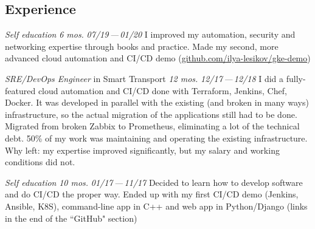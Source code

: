 \documentclass[11pt, a4paper]{article}
\newcommand{\Delimitline}{
  \vspace{-2ex}
  \noindent\makebox[\linewidth]{\rule{\DelimitlineLength}{0.12ex}} }
\newcommand{\forceindent}{\leavevmode{\parindent=1em\indent}}
\begin{document}
\subsection*{\vphantom{Professional Work }Experience}
\Delimitline

\begin{etaremune}[
  topsep=1ex,itemsep=1.5ex,partopsep=0ex,
  parsep=0ex,rightmargin=1em,leftmargin=2em
]
  \item
    \emph{Self education}\hfill
    \textit{6 mos.}\hspace{1.0em}
    \textit{07/19\,—\,01/20}\vspace{1.5ex}\newline
    \forceindent I improved my automation, security and networking expertise through books and practice. Made my second, more advanced cloud automation and CI/CD demo (\href{https://github.com/ilya-lesikov/gke-demo}{github.com/ilya-lesikov/gke-demo})

  \item
    \emph{SRE/DevOps Engineer}\hfill
    in Smart Transport\hspace{1.0em}
    \textit{12 mos.}\hspace{1.0em}
    \textit{12/17\,—\,12/18}\vspace{1.5ex}\newline
    \forceindent I did a fully-featured cloud automation and CI/CD done with Terraform, Jenkins, Chef, Docker. It was developed in parallel with the existing (and broken in many ways) infrastructure, so the actual migration of the applications still had to be done. Migrated from broken Zabbix to Prometheus, eliminating a lot of the technical debt. 50\% of my work was maintaining and operating the existing infrastructure.\\[0.7ex]
    \forceindent Why left: my expertise improved significantly, but my salary and working conditions did not.

\newpage

  \item
    \emph{Self education}\hfill
    \textit{10 mos.}\hspace{1.0em}
    \textit{01/17\,—\,11/17}\vspace{1.5ex}\newline
    \forceindent Decided to learn how to develop software and do CI/CD the proper way. Ended up with my first CI/CD demo (Jenkins, Ansible, K8S), command-line app in C++ and web app in Python/Django (links in the end of the ``GitHub" section)


\end{etaremune}
\end{document}
